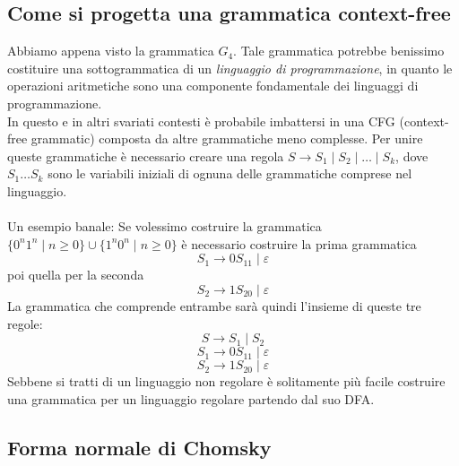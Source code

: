 \subsection{Come si progetta una grammatica context-free}
Abbiamo appena visto la grammatica $G_4$. Tale grammatica potrebbe benissimo costituire una sottogrammatica
di un \textit{linguaggio di programmazione}, in quanto le operazioni aritmetiche sono una componente 
fondamentale dei linguaggi di programmazione. \\
In questo e in altri svariati contesti è probabile imbattersi in una CFG (context-free grammatic) composta da altre grammatiche meno complesse.
Per unire queste grammatiche è necessario creare una regola 
$S \rightarrow S_1 \mid S_2 \mid \dots \mid S_k$,
dove $S_1\dots S_k$ sono le variabili iniziali di ognuna delle grammatiche comprese nel linguaggio. \\
\\
Un esempio banale:
Se volessimo costruire la grammatica $\{0^n1^n\mid n\geq 0\}\cup \{1^n0^n\mid n\geq 0\}$ 
è necessario costruire la prima grammatica $$S_1\rightarrow 0S_11\mid \varepsilon$$
poi quella per la seconda $$S_2 \rightarrow 1S_20\mid\varepsilon$$
La grammatica che comprende entrambe sarà quindi l'insieme di queste tre regole:
$$ S\rightarrow S_1\mid S_2$$
$$S_1\rightarrow 0S_11\mid\varepsilon$$
$$S_2\rightarrow 1S_20\mid\varepsilon$$
Sebbene si tratti di un linguaggio non regolare è solitamente più facile costruire una grammatica per un linguaggio regolare partendo dal suo DFA.

\subsection{Forma normale di Chomsky}
